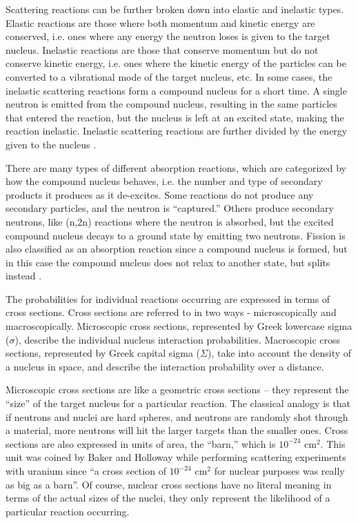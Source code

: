 Scattering reactions can be further broken down into elastic and inelastic types.  Elastic reactions are those where both momentum and kinetic energy are conserved, i.e. ones where any energy the neutron loses is given to the target nucleus.  Inelastic reactions are those that conserve momentum but do not conserve kinetic energy, i.e. ones where the kinetic energy of the particles can be converted to a vibrational mode of the target nucleus, etc.  In some cases, the inelastic scattering reactions form a compound nucleus for a short time.  A single neutron is emitted from the compound nucleus, resulting in the same particles that entered the reaction, but the nucleus is left at an excited state, making the reaction inelastic.  Inelastic scattering reactions are further divided by the energy given to the nucleus \cite{duderstadt}.  

There are many types of different absorption reactions, which are categorized by how the compound nucleus behaves, i.e. the number and type of secondary products it produces as it de-excites.  Some reactions do not produce any secondary particles, and the neutron is ``captured.''  Others produce secondary neutrons, like (n,2n) reactions where the neutron is absorbed, but the excited compound nucleus decays to a ground state by emitting two neutrons.  Fission is also classified as an absorption reaction since a compound nucleus is formed, but in this case the compound nucleus does not relax to another state, but splits instead \cite{duderstadt}. 

The probabilities for individual reactions occurring are expressed in terms of cross sections.  Cross sections are referred to in two ways - microscopically and macroscopically.  Microscopic cross sections, represented by Greek lowercase sigma ($\sigma$), describe the individual nucleus interaction probabilities.  Macroscopic cross sections, represented by Greek capital sigma ($\Sigma$), take into account the density of a nucleus in space, and describe the interaction probability over a distance.  

Microscopic cross sections are like a geometric cross sections -- they represent the ``size'' of the target nucleus for a particular reaction.  The classical analogy is that if neutrons and nuclei are hard spheres, and neutrons are randomly shot through a material, more neutrons will hit the larger targets than the smaller ones.  Cross sections are also expressed in units of area, the ``barn,'' which is $10^{-24}$ cm$^2$.  This unit was coined by Baker and Holloway while performing scattering experiments with uranium since ``a cross section of $10^{-24}$ cm$^2$ for nuclear purposes was really as big as a barn''\cite{LAMS523}.  Of course, nuclear cross sections have no literal meaning in terms of the actual sizes of the nuclei, they only represent the likelihood of a particular reaction occurring.  

